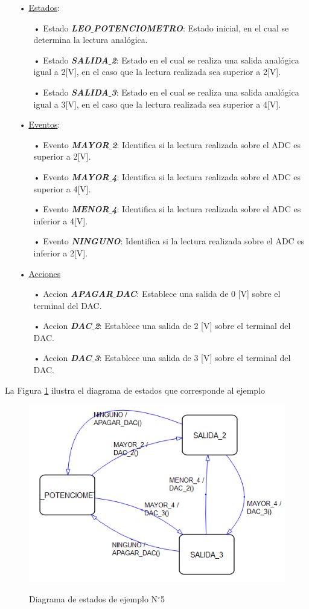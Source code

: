 \documentclass[12pt,letterpaper]{article}
\begin{document}
\begin{enumerate}
\item[•]\underline{Estados}:
\begin{enumerate}
\item[•]Estado \textit{\textbf{LEO$\_$POTENCIOMETRO}}: Estado inicial, en el cual se determina la lectura analógica.
\item[•]Estado \textit{\textbf{SALIDA$\_$2}}: Estado en el cual se realiza una salida analógica igual a 2[V], en el caso que la lectura realizada sea superior a 2[V].
\item[•]Estado \textit{\textbf{SALIDA$\_$3}}: Estado en el cual se realiza una salida analógica igual a 3[V], en el caso que la lectura realizada sea superior a 4[V].
\end{enumerate}
\item[•]\underline{Eventos}:
\begin{enumerate}
\item[•]Evento \textit{\textbf{MAYOR$\_$2}}: Identifica si la lectura realizada sobre el ADC es superior a 2[V].
\item[•]Evento \textit{\textbf{MAYOR$\_$4}}: Identifica si la lectura realizada sobre el ADC es superior a 4[V].
\item[•]Evento \textit{\textbf{MENOR$\_$4}}: Identifica si la lectura realizada sobre el ADC es inferior a 4[V].
\item[•]Evento \textit{\textbf{NINGUNO}}: Identifica si la lectura realizada sobre el ADC es inferior a 2[V].
\end{enumerate}
\item[•]\underline{Acciones}
\begin{enumerate}
\item[•]Accion \textit{\textbf{APAGAR$\_$DAC}}: Establece una salida de 0 [V] sobre el terminal del DAC.
\item[•]Accion \textit{\textbf{DAC$\_$2}}: Establece una salida de 2 [V] sobre el terminal del DAC.
\item[•]Accion \textit{\textbf{DAC$\_$3}}: Establece una salida de 3 [V] sobre el terminal del DAC.
\end{enumerate}
\end{enumerate}

La Figura \ref{Fig28} ilustra el diagrama de estados que corresponde al ejemplo

\begin{center}
\begin{figure}[!h]
\centering
\includegraphics[width=6 cm]{figuras/f10.png}\\
\caption{Diagrama de estados de ejemplo N$^{\circ}$5}
\label{Fig28}
\end{figure}
\end{center}
\end{document}
